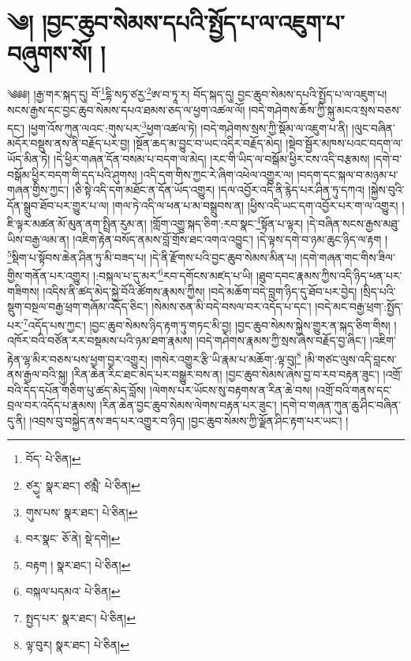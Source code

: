 \setcounter{footnote}{0} 
\chapter{༄། །བྱང་ཆུབ་སེམས་དཔའི་སྤྱོད་པ་ལ་འཇུག་པ་བཞུགས་སོ། །}༄༅༅། །རྒྱ་གར་སྐད་དུ། བོ་\footnote{བོད་  པེ་ཅིན། }དྷི་སཏྭ་ཙརྱ་\footnote{ཙརྱྭ་  སྣར་ཐང་། ཙམླཻ་  པེ་ཅིན། }ཨ་བ་ཏཱ་ར། བོད་སྐད་དུ། བྱང་ཆུབ་སེམས་དཔའི་སྤྱོད་པ་ལ་འཇུག་པ། སངས་རྒྱས་དང་བྱང་ཆུབ་སེམས་དཔའ་ཐམས་ཅད་ལ་ཕྱག་འཚལ་ལོ། །བདེ་གཤེགས་ཆོས་ཀྱི་སྐུ་མངའ་སྲས་བཅས་དང་། །ཕྱག་འོས་ཀུན་ལའང་:གུས་པར་\footnote{གུས་པས་  སྣར་ཐང་།  པེ་ཅིན། }ཕྱག་འཚལ་ཏེ། །བདེ་གཤེགས་སྲས་ཀྱི་སྡོམ་ལ་འཇུག་པ་ནི། །ལུང་བཞིན་མདོར་བསྡུས་ནས་ནི་བརྗོད་པར་བྱ། །སྔོན་ཆད་མ་བྱུང་བ་ཡང་འདིར་བརྗོད་མེད། །སྡེབ་སྦྱོར་མཁས་པའང་བདག་ལ་ཡོད་མིན་ཏེ། །དེ་ཕྱིར་གཞན་དོན་བསམ་པ་བདག་ལ་མེད། །རང་གི་ཡིད་ལ་བསྒོམ་ཕྱིར་ངས་འདི་བརྩམས། །དགེ་བ་བསྒོམ་ཕྱིར་བདག་གི་དད་པའི་ཤུགས། །འདི་དག་གིས་ཀྱང་རེ་ཞིག་འཕེལ་འགྱུར་ལ། །བདག་དང་སྐལ་བ་མཉམ་པ་གཞན་གྱིས་ཀྱང་། །ཅི་སྟེ་འདི་དག་མཐོང་ན་དོན་ཡོད་འགྱུར། །དལ་འབྱོར་འདི་ནི་རྙེད་པར་ཤིན་ཏུ་དཀའ། །སྐྱེས་བུའི་དོན་སྒྲུབ་ཐོབ་པར་གྱུར་པ་ལ། །གལ་ཏེ་འདི་ལ་ཕན་པ་མ་བསྒྲུབས་ན། །ཕྱིས་འདི་ཡང་དག་འབྱོར་པར་ག་ལ་འགྱུར། །ཇི་ལྟར་མཚན་མོ་མུན་ནག་སྤྲིན་རུམ་ན། །གློག་འགྱུ་སྐད་ཅིག་:རབ་སྣང་\footnote{བར་སྣང་  ཅོ་ནེ།  སྡེ་དགེ། }སྟོན་པ་ལྟར། །དེ་བཞིན་སངས་རྒྱས་མཐུ་ཡིས་བརྒྱ་ལམ་ན། །འཇིག་རྟེན་བསོད་ནམས་བློ་གྲོས་ཐང་འགའ་འབྱུང་། །དེ་ལྟས་དགེ་བ་ཉམ་ཆུང་ཉིད་ལ་རྟག །\footnote{བརྟག །  སྣར་ཐང་།  པེ་ཅིན། }སྡིག་པ་སྟོབས་ཆེན་ཤིན་ཏུ་མི་བཟད་པ། །དེ་ནི་རྫོགས་པའི་བྱང་ཆུབ་སེམས་མིན་པ། །དགེ་གཞན་གང་གིས་ཟིལ་གྱིས་གནོན་པར་འགྱུར། །:བསྐལ་པ་དུ་མར་\footnote{བསྐལ་པདམའ་  པེ་ཅིན། }རབ་དགོངས་མཛད་པ་ཡི། །ཐུབ་དབང་རྣམས་ཀྱིས་འདི་ཉིད་ཕན་པར་གཟིགས། །འདིས་ནི་ཚད་མེད་སྐྱེ་བོའི་ཚོགས་རྣམས་ཀྱིས། །བདེ་མཆོག་བདེ་བླག་ཉིད་དུ་ཐོབ་པར་བྱེད། །སྲིད་པའི་སྡུག་བསྔལ་བརྒྱ་ཕྲག་གཞོམ་འདོད་ཅིང་། །སེམས་ཅན་མི་བདེ་བསལ་བར་འདོད་པ་དང་། །བདེ་མང་བརྒྱ་ཕྲག་:སྤྱོད་པར་\footnote{སྤྱད་པར་  སྣར་ཐང་།  པེ་ཅིན། }འདོད་པས་ཀྱང་། །བྱང་ཆུབ་སེམས་ཉིད་རྟག་ཏུ་གཏང་མི་བྱ། །བྱང་ཆུབ་སེམས་སྐྱེས་གྱུར་ན་སྐད་ཅིག་གིས། །འཁོར་བའི་བཙོན་རར་བསྡམས་པའི་ཉམ་ཐག་རྣམས། །བདེ་གཤེགས་རྣམས་ཀྱི་སྲས་ཞེས་བརྗོད་བྱ་ཞིང་། །འཇིག་རྟེན་ལྷ་མིར་བཅས་པས་ཕྱག་བྱར་འགྱུར། །གསེར་འགྱུར་རྩི་ཡི་རྣམ་པ་མཆོག་:ལྟ་བུ།\footnote{ལྟ་བུར།  སྣར་ཐང་།  པེ་ཅིན། } །མི་གཙང་ལུས་འདི་བླངས་ནས་རྒྱལ་བའི་སྐུ། །རིན་ཆེན་རིང་ཐང་མེད་པར་བསྒྱུར་བས་ན། །བྱང་ཆུབ་སེམས་ཞེས་བྱ་བ་རབ་བརྟན་ཟུང་། །འགྲོ་བའི་དེད་དཔོན་གཅིག་པུ་ཚད་མེད་བློས། །ལེགས་པར་ཡོངས་སུ་བརྟགས་ན་རིན་ཆེ་བས། །འགྲོ་བའི་གནས་དང་བྲལ་བར་འདོད་པ་རྣམས། །རིན་ཆེན་བྱང་ཆུབ་སེམས་ལེགས་བརྟན་པར་ཟུང་། །དགེ་བ་གཞན་ཀུན་ཆུ་ཤིང་བཞིན་དུ་ནི། །འབྲས་བུ་བསྐྱེད་ནས་ཟད་པར་འགྱུར་བ་ཉིད། །བྱང་ཆུབ་སེམས་ཀྱི་ལྗོན་ཤིང་རྟག་པར་ཡང་། །
